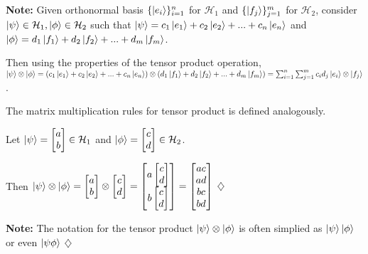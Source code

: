 \documentclass[12pt,twoside,fleqn]{report}
\theoremstyle{thmstyle}
\newenvironment{note}{\textbf{Note:}}{\hfill\ensuremath{\diamondsuit}}
\begin{document}
\begin{note}
    Given orthonormal basis $\{ \ket{e_i} \}_{i=1}^n$ for $\mathcal{H}_1$ and $\{ \ket{f_j} \}_{j=1}^m$ for $\mathcal{H}_2$, consider $\ket\psi \in \mathcal{H}_1, \ket\phi \in \mathcal{H}_2$ such that $\ket\psi = c_1 \ket{e_1} + c_2 \ket{e_2} + ... + c_n \ket{e_n}$ and $\ket{\phi} = d_1 \ket{f_1} + d_2 \ket{f_2} + ... + d_m \ket{f_m}$.

    Then using the properties of the tensor product operation, $\ket\psi \otimes \ket\phi = ( c_1 \ket{e_1} + c_2 \ket{e_2} + ... + c_n \ket{e_n} ) \otimes (d_1 \ket{f_1} + d_2 \ket{f_2} + ... + d_m \ket{f_m}) = \sum_{i=1}^n \sum_{j=1}^m c_i d_j \ket{e_i} \otimes \ket{f_j}$.

    The matrix multiplication rules for tensor product is defined analogously. 

    Let $\ket\psi = \begin{bmatrix} a \\ b \end{bmatrix} \in \mathcal{H}_1$ and $\ket\phi = \begin{bmatrix} c \\ d \end{bmatrix} \in \mathcal{H}_2$.

        Then $\ket{\psi} \otimes \ket{\phi} = \begin{bmatrix} a \\ b \end{bmatrix} \otimes \begin{bmatrix} c \\ d \end{bmatrix} = \begin{bmatrix} a \begin{bmatrix} c \\ d \end{bmatrix} \\ b \begin{bmatrix} c \\ d \end{bmatrix} \end{bmatrix} = \begin{bmatrix} ac \\ ad \\ bc \\ bd \end{bmatrix}$
\end{note}

\begin{note}
    The notation for the  tensor product $\ket\psi \otimes \ket\phi$ is often simplied as $\ket\psi \ket\phi$ or even $\ket{\psi\phi}$
\end{note}
\end{document}

